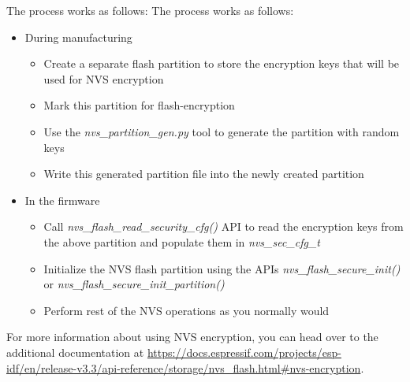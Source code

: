 \documentclass[main.tex]{subfiles}
\begin{document}
The process works as follows:
The process works as follows:
\begin{itemize}
\item During manufacturing
  \begin {itemize}
  \item Create a separate flash partition to store the encryption keys that will be used for NVS encryption
  \item Mark this partition for flash-encryption
  \item Use the \textit{nvs\_partition\_gen.py} tool to generate the partition with random keys
  \item Write this generated partition file into the newly created partition
  \end {itemize}
\item In the firmware
  \begin {itemize}
  \item Call \textit{nvs\_flash\_read\_security\_cfg()} API to read the encryption keys from the above partition and populate them in \textit{nvs\_sec\_cfg\_t}
  \item Initialize the NVS flash partition using the APIs \textit{nvs\_flash\_secure\_init()} or \textit{nvs\_flash\_secure\_init\_partition()}
  \item Perform rest of the NVS operations as you normally would
  \end {itemize}
\end{itemize}

For more information about using NVS encryption, you can head over to the additional documentation at \url{https://docs.espressif.com/projects/esp-idf/en/release-v3.3/api-reference/storage/nvs_flash.html#nvs-encryption}.
\end{document}
